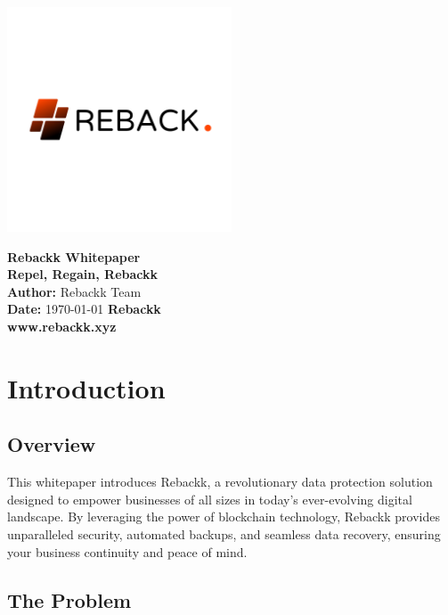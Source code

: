 \documentclass[12pt]{article}
\begin{document}
\begin{titlepage}
    \centering
    \includegraphics[width=0.5\textwidth]{assets/logo.png}\par\vspace{1cm}
    \Huge\textbf{Rebackk Whitepaper} \\
    \Large\textbf{Repel, Regain, Rebackk} \\[1cm]
    \large
    \textbf{Author:}  Rebackk Team \\
    \textbf{Date:} \today 
    \vfill
    \textbf{Rebackk} \\
    \textbf{www.rebackk.xyz}
\end{titlepage}

\tableofcontents
\newpage

\section{Introduction}

\subsection{Overview}

This whitepaper introduces Rebackk, a revolutionary data protection solution designed to empower businesses of all sizes in today's ever-evolving digital landscape. By leveraging the power of blockchain technology, Rebackk provides unparalleled security, automated backups, and seamless data recovery, ensuring your business continuity and peace of mind.

\subsection{The Problem}
\end{document}
